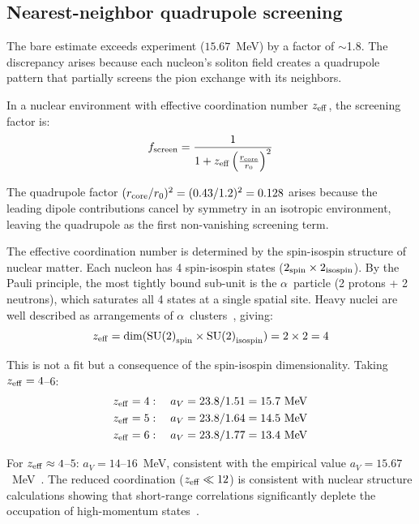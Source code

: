 ﻿\documentclass[twocolumn,showpacs,preprintnumbers,amsmath,amssymb,prc]{revtex4-2}
\begin{document}
\subsection{Nearest-neighbor quadrupole screening}

The bare estimate exceeds experiment ($15.67$~MeV) by a factor of $\sim$1.8. The discrepancy arises because each nucleon's soliton field creates a quadrupole pattern that partially screens the pion exchange with its neighbors.

In a nuclear environment with effective coordination number $z_{\rm eff}$, the screening factor is:
\begin{equation}
f_{\rm screen} = \frac{1}{1 + z_{\rm eff}\left(\frac{r_{\rm core}}{r_0}\right)^2}
\end{equation}

The quadrupole factor $(r_{\rm core}/r_0)^2 = (0.43/1.2)^2 = 0.128$ arises because the leading dipole contributions cancel by symmetry in an isotropic environment, leaving the quadrupole as the first non-vanishing screening term.

The effective coordination number is determined by the spin-isospin structure of nuclear matter. Each nucleon has 4 spin-isospin states ($2_{\rm spin} \times 2_{\rm isospin}$). By the Pauli principle, the most tightly bound sub-unit is the $\alpha$~particle (2 protons + 2 neutrons), which saturates all 4 states at a single spatial site. Heavy nuclei are well described as arrangements of $\alpha$~clusters~\cite{Wiringa1995}, giving:
\begin{equation}
z_{\rm eff} = \dim(\text{SU(2)}_{\rm spin} \times \text{SU(2)}_{\rm isospin}) = 2 \times 2 = 4
\end{equation}

This is not a fit but a consequence of the spin-isospin dimensionality. Taking $z_{\rm eff} = 4$--$6$:
\begin{align}
z_{\rm eff} = 4: \quad a_V &= 23.8 / 1.51 = 15.7~\text{MeV} \\
z_{\rm eff} = 5: \quad a_V &= 23.8 / 1.64 = 14.5~\text{MeV} \\
z_{\rm eff} = 6: \quad a_V &= 23.8 / 1.77 = 13.4~\text{MeV}
\end{align}

For $z_{\rm eff} \approx 4$--$5$: $a_V = 14$--$16$~MeV, consistent with the empirical value $a_V = 15.67$~MeV~\cite{Weizsacker1935}. The reduced coordination ($z_{\rm eff} \ll 12$) is consistent with nuclear structure calculations showing that short-range correlations significantly deplete the occupation of high-momentum states~\cite{Wiringa1995}.
\end{document}

